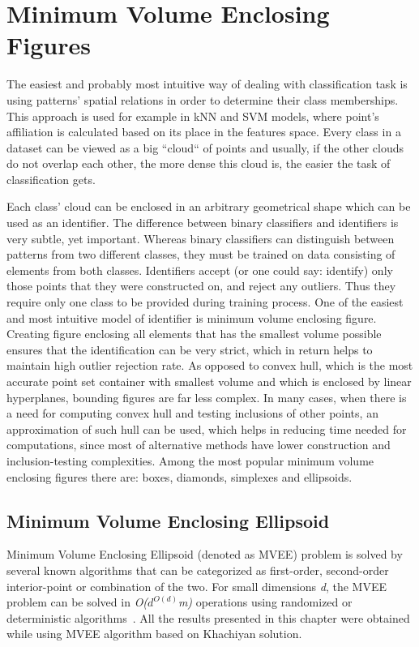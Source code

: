 \section{Minimum Volume Enclosing Figures}

The easiest and probably most intuitive way of dealing with classification task is using patterns' spatial relations in order to determine their class memberships. This approach is used for example in kNN and SVM models, where point's affiliation is calculated based on its place in the features space. Every class in a dataset can be viewed as a big ``cloud`` of points and usually, if the other clouds do not overlap each other, the more dense this cloud is, the easier the task of classification gets.

Each class' cloud can be enclosed in an arbitrary geometrical shape which can be used as an identifier. The difference between binary classifiers and identifiers is very subtle, yet important. Whereas binary classifiers can distinguish between patterns from two different classes, they must be trained on data consisting of elements from both classes. Identifiers accept (or one could say: identify) only those points that they were constructed on, and reject any outliers. Thus they require only one class to be provided during training process. One of the easiest and most intuitive model of identifier is minimum volume enclosing figure. Creating figure enclosing all elements that has the smallest volume possible ensures that the identification can be very strict, which in return helps to maintain high outlier rejection rate. As opposed to convex hull, which is the most accurate point set container with smallest volume and which is enclosed by linear hyperplanes, bounding figures are far less complex. In many cases, when there is a need for computing convex hull and testing inclusions of other points, an approximation of such hull can be used, which helps in reducing time needed for computations, since most of alternative methods have lower construction and inclusion-testing complexities. Among the most popular minimum volume enclosing figures there are: boxes, diamonds, simplexes and ellipsoids.

\subsection{Minimum Volume Enclosing Ellipsoid}

Minimum Volume Enclosing Ellipsoid (denoted as MVEE) problem is solved by several known algorithms that can be categorized as first-order, second-order interior-point or combination of the two. For small dimensions \textit{d}, the MVEE problem can be solved in \textit{O($d^{O(d)}$m)} operations using randomized or deterministic algorithms~\cite{MVEEMichaelTodd2005}. All the results presented in this chapter were obtained while using MVEE algorithm based on Khachiyan solution.

